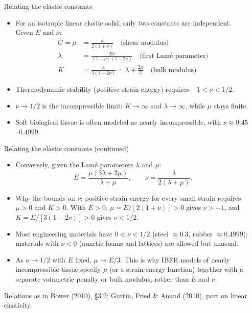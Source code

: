 \documentclass[aspectratio=169,11pt]{beamer}
\begin{document}
\begin{frame}{Relating the elastic constants}
  \begin{itemize}
    \item For an isotropic linear elastic solid, only two constants are independent. Given $E$ and $\nu$:
      \begin{align*}
        G = \mu &= \frac{E}{2(1+\nu)} \quad \text{(shear modulus)}\\
        \lambda &= \frac{E\nu}{(1+\nu)(1-2\nu)} \quad \text{(first Lam\'e parameter)}\\
        K &= \frac{E}{3(1-2\nu)} = \lambda + \frac{2\mu}{3} \quad \text{(bulk modulus)}
      \end{align*}
    \item Thermodynamic stability (positive strain energy) requires $-1 < \nu < 1/2$.
    \item $\nu \to 1/2$ is the incompressible limit: $K \to \infty$ and $\lambda \to \infty$, while $\mu$ stays finite.
    \item Soft biological tissue is often modeled as nearly incompressible, with $\nu \approx 0.45$--$0.4999$.
  \end{itemize}
\end{frame}

\begin{frame}{Relating the elastic constants (continued)}
  \begin{itemize}
    \item Conversely, given the Lam\'e parameters $\lambda$ and $\mu$:
      \[
        E = \frac{\mu(3\lambda+2\mu)}{\lambda+\mu}, \qquad
        \nu = \frac{\lambda}{2(\lambda+\mu)} .
      \]
    \item Why the bounds on $\nu$: positive strain energy for every small strain requires $\mu > 0$ and $K > 0$. With $E>0$,
      $\mu = E/[2(1+\nu)] > 0$ gives $\nu > -1$, and $K = E/[3(1-2\nu)] > 0$ gives $\nu < 1/2$.
    \item Most engineering materials have $0 < \nu < 1/2$ (steel $\approx 0.3$, rubber $\approx 0.4999$); materials with $\nu < 0$ (auxetic foams and lattices) are allowed but unusual.
    \item As $\nu \to 1/2$ with $E$ fixed, $\mu \to E/3$. This is why IBFE models of nearly incompressible tissue specify $\mu$ (or a strain-energy function) together with a separate volumetric penalty or bulk modulus, rather than $E$ and $\nu$.
  \end{itemize}
  \vspace{2mm}
  {\tiny\color{DarkGray}Relations as in Bower (2010), \S3.2; Gurtin, Fried \& Anand (2010), part on linear elasticity.\par}
\end{frame}
\end{document}
